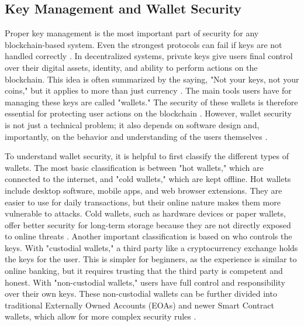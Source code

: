 \subsection{Key Management and Wallet Security}
Proper key management is the most important part of security for any blockchain-based system. Even the strongest protocols can fail if keys are not handled correctly \cite{fumy1993}. In decentralized systems, private keys give users final control over their digital assets, identity, and ability to perform actions on the blockchain. This idea is often summarized by the saying, "Not your keys, not your coins," but it applies to more than just currency \cite{yu2024}. The main tools users have for managing these keys are called "wallets." The security of these wallets is therefore essential for protecting user actions on the blockchain \cite{suratkar2020}. However, wallet security is not just a technical problem; it also depends on software design and, importantly, on the behavior and understanding of the users themselves \cite{yu2024}.

To understand wallet security, it is helpful to first classify the different types of wallets. The most basic classification is between "hot wallets," which are connected to the internet, and "cold wallets," which are kept offline. Hot wallets include desktop software, mobile apps, and web browser extensions. They are easier to use for daily transactions, but their online nature makes them more vulnerable to attacks. Cold wallets, such as hardware devices or paper wallets, offer better security for long-term storage because they are not directly exposed to online threats \cite{suratkar2020}. Another important classification is based on who controls the keys. With "custodial wallets," a third party like a cryptocurrency exchange holds the keys for the user. This is simpler for beginners, as the experience is similar to online banking, but it requires trusting that the third party is competent and honest. With "non-custodial wallets," users have full control and responsibility over their own keys. These non-custodial wallets can be further divided into traditional Externally Owned Accounts (EOAs) and newer Smart Contract wallets, which allow for more complex security rules \cite{yu2024, suratkar2020}.

